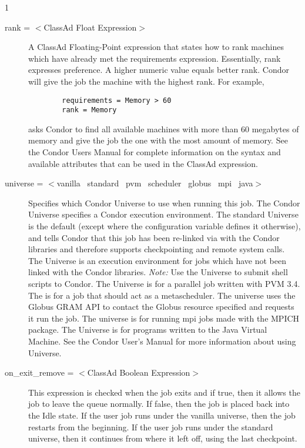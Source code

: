 \begin{ManPage}{\label{man-condor-submit}}{1}
\begin{description}

\item[rank = $<$ClassAd Float Expression$>$]
A ClassAd Floating-Point 
expression that states how to rank machines which have already met the requirements
expression. Essentially, rank expresses preference.  A higher numeric value 
equals better rank. Condor will give the job the machine with the 
highest rank.  For example,
\begin{verbatim}
        requirements = Memory > 60
        rank = Memory
\end{verbatim}
asks Condor to find all available machines with more than 60 megabytes of memory
and give the job the one with the most amount of memory.  See the Condor Users
Manual for complete information on the syntax and available attributes
that can be used in the ClassAd expression.


\item[universe = $<$vanilla \Bar\ standard \Bar\ pvm \Bar\ scheduler
\Bar\ globus \Bar\ mpi \Bar\ java$>$] 
Specifies which Condor Universe to use when running this job.  The Condor 
Universe specifies a Condor execution environment.  The standard 
Universe is the default (except where the configuration variable
 defines it otherwise),
and tells Condor that this job has been re-linked 
via  with the Condor libraries and therefore supports
checkpointing and remote system calls.  The  Universe is an
execution environment for jobs which have not been linked with the
Condor libraries.  \emph{Note:} Use the  Universe to
submit shell scripts to Condor.  The  Universe is for a
parallel job written with PVM 3.4. The  is for a job that
should act as a metascheduler.
The  universe uses the Globus
GRAM API to contact the Globus resource specified and requests it run the job.
The  universe is
for running mpi jobs made with the MPICH package.
The  Universe is for programs written to the Java Virtual Machine.
See the Condor User's Manual for more information about using Universe.


\item[on\_exit\_remove = $<$ClassAd Boolean Expression$>$] This expression
is checked when the job exits and if true, then it allows the job to leave the
queue normally. If false, then the job is placed back into the Idle state.
If the user job runs under the vanilla universe,
then the job restarts from the beginning.
If the user job runs under the standard universe,
then it continues from where it left off, using the last checkpoint.


\end{description}
\end{ManPage}

